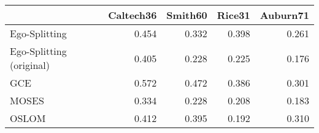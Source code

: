 \begin{tabular}{lrrrr}
\toprule
{} & Caltech36 & Smith60 & Rice31 & Auburn71 \\
\midrule
Ego-Splitting            &     0.454 &   0.332 &  0.398 &    0.261 \\
Ego-Splitting (original) &     0.405 &   0.228 &  0.225 &    0.176 \\
GCE                      &     0.572 &   0.472 &  0.386 &    0.301 \\
MOSES                    &     0.334 &   0.228 &  0.208 &    0.183 \\
OSLOM                    &     0.412 &   0.395 &  0.192 &    0.310 \\
\bottomrule
\end{tabular}
